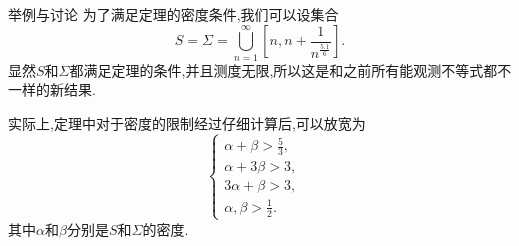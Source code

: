 \begin{frame}[t]{举例与讨论}
  为了满足定理的密度条件,我们可以设集合
  \begin{equation}
    S=\Sigma=\bigcup_{n=1}^{\infty}[n,n+\frac{1}{n^{\frac{5.1}{6}}}].
  \end{equation}
  显然$S$和$\Sigma$都满足定理的条件,并且测度无限,所以这是和之前所有能观测不等式都不一样的新结果.

  实际上,定理中对于密度的限制经过仔细计算后,可以放宽为
  \begin{equation}
    \begin{cases}
      \alpha+\beta>\frac{5}{3}, &\\
      \alpha+3\beta>3, &\\
      3\alpha+\beta>3,&\\
      \alpha,\beta>\frac{1}{2}.&

    \end{cases}
  \end{equation}
  其中$\alpha$和$\beta$分别是$S$和$\Sigma$的密度.
\end{frame}
